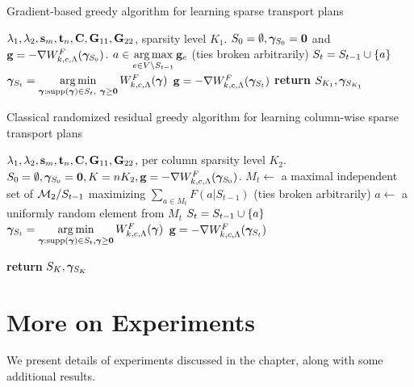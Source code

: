 \begin{algorithm}[ht!]
\caption{Gradient-based greedy algorithm for learning sparse transport plans}\label{alg:gensparseOT_dash}
\begin{algorithmic}[1]
\Require  $\lambda_1, \lambda_2, \mathbf{s}_m, \mathbf{t}_n, \mathbf{C}, \mathbf{G}_{11}, \mathbf{G}_{22}$, sparsity level $K_1$.
\State $S_0=\emptyset, \bm{\gamma}_{S_0}=\mathbf{0}$ and $\mathbf{g} = -\nabla W^F_{k, c, \Lambda}(\bm{\gamma}_{S_0})$.
\State $a \in \mathop{\rm arg\,max}\limits_{e\in V\setminus S_{t-1}}{\mathbf{g}_e}$ (ties broken arbitrarily)
\State  $S_t = S_{t-1}\cup \{a\}$
\State  $\bm{\gamma}_{S_t} = \mathop{\rm arg\,min}\limits_{\bm{\gamma}:\textup{supp}(\bm{\gamma})\in S_t,~ \bm{\gamma}\ge \mathbf{0}}{W^F_{k, c, \Lambda}(\bm{\gamma})}$
\State $\mathbf{g} = -\nabla W^F_{k, c, \Lambda}(\bm{\gamma}_{S_t})$
\EndFor
\State \textbf{return} $S_{K_1}, \bm{\gamma}_{S_{K_1}}$
\end{algorithmic}
\end{algorithm}

\begin{algorithm}[ht!]
\caption{Classical randomized residual greedy algorithm for learning column-wise sparse transport plans}\label{alg:matroid}
\begin{algorithmic}[1]
\Require  $\lambda_1, \lambda_2, \mathbf{s}_m, \mathbf{t}_n, \mathbf{C}, \mathbf{G}_{11}, \mathbf{G}_{22}$, per column sparsity level $K_2$.
\State $S_0=\emptyset, \bm{\gamma}_{S_0} = \mathbf{0}, K=nK_2,\mathbf{g} = -\nabla W^F_{k, c, \Lambda}(\bm{\gamma}_{S_0})$.
\State $M_t\leftarrow $ a maximal independent set of $\mathcal{M}_2/S_{t-1}$ maximizing $\sum_{a\in M_t}F(a|S_{t-1})$ (ties broken arbitrarily)
\State $a\leftarrow$ a uniformly random element from $M_t$
\State $S_t = S_{t-1}\cup \{a\}$
\State $\bm{\gamma}_{S_t} = \mathop{\rm arg\,min}\limits_{\bm{\gamma}:\textup{supp}(\bm{\gamma})\in S_t,\bm{\gamma}\ge \mathbf{0}}{W^F_{k, c, \Lambda}(\bm{\gamma})}$ 
\State $\mathbf{g} = -\nabla W^F_{k, c, \Lambda}(\bm{\gamma}_{S_{t}})$

\EndFor
\State \textbf{return} $S_{K}, \bm{\gamma}_{S_{K}}$
\end{algorithmic}
\end{algorithm}

\resumetoc

\section{More on Experiments}\label{app:exp}
\stoptoc
We present details of experiments discussed in the chapter, along with some additional results.


